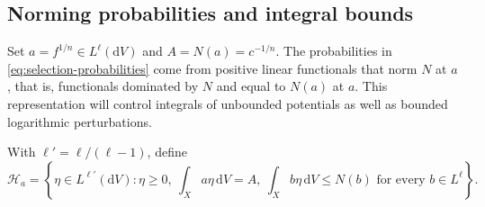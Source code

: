 \subsection{Norming probabilities and integral bounds}

Set $a=f^{1/n}\in L^\ell(\mathrm{d}V)$ and $A=N(a)=c^{-1/n}$. The probabilities in \eqref{eq:selection-probabilities} come from positive linear functionals that norm $N$ at $a$, that is, functionals dominated by $N$ and equal to $N(a)$ at $a$. This representation will control integrals of unbounded potentials as well as bounded logarithmic perturbations.

With $\ell'=\ell/(\ell-1)$, define
\begin{equation}\label{eq:selection-norming-face}
 \mathcal H_a=\left\{\eta\in L^{\ell'}(\mathrm{d}V):
 \eta\geq0,\ \int_Xa\eta\,\mathrm{d}V=A,\
 \int_Xb\eta\,\mathrm{d}V\leq N(b)\text{ for every }b\in L^\ell\right\}.
\end{equation}

